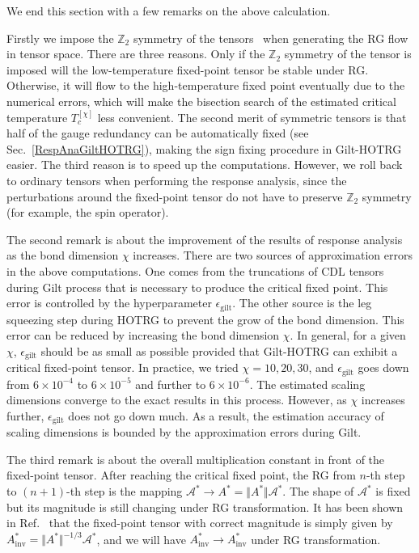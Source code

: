 \documentclass[aps,prb,reprint,superscriptaddress]{revtex4-2}
\begin{document}
We end this section with a few remarks on the above calculation. 
%

Firstly we impose the $\mathbb{Z}_2$ symmetry of the
tensors~\cite{Singh2010SymTen, Singh2011U1Ten} when generating the RG
flow in tensor space. There are three reasons. Only if the
$\mathbb{Z}_2$ symmetry of the tensor is imposed will the
low-temperature fixed-point tensor be stable under RG.  Otherwise, it
will flow to the high-temperature fixed point eventually due to the
numerical errors, which will make the bisection search of the estimated
critical temperature $T_c^{[\chi]}$ less convenient. The second merit of
symmetric tensors is that half of the gauge redundancy can be
automatically fixed (see Sec.~\ref{RespAnaGiltHOTRG}), making the sign
fixing procedure in Gilt-HOTRG easier. The third reason is to speed up
the computations. However, we roll back to ordinary tensors when
performing the response analysis, since the perturbations around the
fixed-point tensor do not have to preserve $\mathbb{Z}_2$ symmetry (for
example, the spin operator). 
%

The second remark is about the improvement of the results of response
analysis as the bond dimension $\chi$ increases. There are two sources
of approximation errors in the above computations. One comes from the
truncations of CDL tensors during Gilt process that is necessary to
produce the critical fixed point. This error is controlled by the
hyperparameter $\epsilon_{\text{gilt}}$. The other source is the leg
squeezing step during HOTRG to prevent the grow of the bond dimension.
This error can be reduced by increasing the bond dimension $\chi$. In
general, for a given $\chi$, $\epsilon_{\text{gilt}}$ should be as small
as possible provided that Gilt-HOTRG can exhibit a critical fixed-point
tensor. In practice, we tried $\chi = 10, 20, 30$, and
$\epsilon_{\text{gilt}}$ goes down from $6\times 10^{-4}$ to
$6\times10^{-5}$ and further to $6\times10^{-6}$.  The estimated scaling
dimensions converge to the exact results in this process. However, as
$\chi$ increases further, $\epsilon_{\text{gilt}}$ does not go down
much. As a result, the estimation accuracy of scaling dimensions is
bounded by the approximation errors during Gilt. 
%

The third remark is about the overall multiplication constant in front
of the fixed-point tensor. After reaching the critical fixed point, the
RG from $n$-th step to $(n+1)$-th step is the mapping
$\mathcal{A}^{*}\rightarrow A^{*} = \Vert A^{*} \Vert
\mathcal{A}^{*}$. The shape of $\mathcal{A}^*$ is fixed but its
magnitude is still changing under RG transformation. It has been shown
in Ref.~\cite{GuWen2009} that the fixed-point tensor with correct
magnitude is simply given by $A^*_{\text{inv}} = \Vert A^* \Vert^{-1/3}
\mathcal{A}^*$, and we will have $A^*_{\text{inv}}\rightarrow
A^*_{\text{inv}}$ under RG transformation.
%
\end{document}
